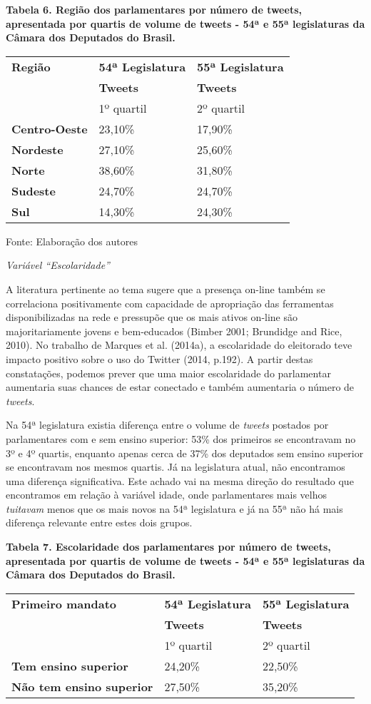 \textbf{Tabela 6. Região dos parlamentares por número de tweets,
apresentada por quartis de volume de tweets - 54ª e 55ª legislaturas da
Câmara dos Deputados do Brasil.}

\begin{longtable}[]{@{}lll@{}}
\toprule
\textbf{Região} & \textbf{54ª Legislatura} & \textbf{55ª
Legislatura}\tabularnewline
& \textbf{Tweets} & \textbf{Tweets}\tabularnewline
& 1º quartil & 2º quartil\tabularnewline
\textbf{Centro-Oeste} & 23,10\% & 17,90\%\tabularnewline
\textbf{Nordeste} & 27,10\% & 25,60\%\tabularnewline
\textbf{Norte} & 38,60\% & 31,80\%\tabularnewline
\textbf{Sudeste} & 24,70\% & 24,70\%\tabularnewline
\textbf{Sul} & 14,30\% & 24,30\%\tabularnewline
\bottomrule
\end{longtable}

Fonte: Elaboração dos autores

\emph{Variável ``Escolaridade'' }

A literatura pertinente ao tema sugere que a presença on-line também se
correlaciona positivamente com capacidade de apropriação das ferramentas
disponibilizadas na rede e pressupõe que os mais ativos on-line são
majoritariamente jovens e bem-educados (Bimber 2001; Brundidge and Rice,
2010). No trabalho de Marques et al. (2014a), a escolaridade do
eleitorado teve impacto positivo sobre o uso do Twitter (2014, p.192). A
partir destas constatações, podemos prever que uma maior escolaridade do
parlamentar aumentaria suas chances de estar conectado e também
aumentaria o número de \emph{tweets}.

Na 54ª legislatura existia diferença entre o volume de \emph{tweets}
postados por parlamentares com e sem ensino superior: 53\% dos primeiros
se encontravam no 3º e 4º quartis, enquanto apenas cerca de 37\% dos
deputados sem ensino superior se encontravam nos mesmos quartis. Já na
legislatura atual, não encontramos uma diferença significativa. Este
achado vai na mesma direção do resultado que encontramos em relação à
variável idade, onde parlamentares mais velhos \emph{tuitavam} menos que
os mais novos na 54ª legislatura e já na 55ª não há mais diferença
relevante entre estes dois grupos.

\textbf{Tabela 7. Escolaridade dos parlamentares por número de tweets,
apresentada por quartis de volume de tweets - 54ª e 55ª legislaturas da
Câmara dos Deputados do Brasil.}

\begin{longtable}[]{@{}lll@{}}
\toprule
\textbf{Primeiro mandato} & \textbf{54ª Legislatura} & \textbf{55ª
Legislatura}\tabularnewline
& \textbf{Tweets} & \textbf{Tweets}\tabularnewline
& 1º quartil & 2º quartil\tabularnewline
\textbf{Tem ensino superior} & 24,20\% & 22,50\%\tabularnewline
\textbf{Não tem ensino superior} & 27,50\% & 35,20\%\tabularnewline
\bottomrule
\end{longtable}

